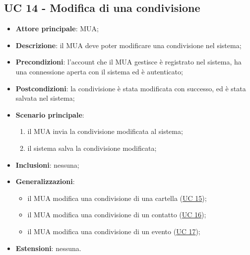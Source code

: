 \subsection{UC 14 - Modifica di una condivisione} \label{sec:UC14}
    \begin{itemize}
        \item \textbf{Attore principale}: MUA;
        \item \textbf{Descrizione}: il MUA deve poter modificare una condivisione nel sistema;
        \item \textbf{Precondizioni}: l’account che il MUA gestisce è registrato nel sistema, ha una connessione aperta con il sistema ed è autenticato;
        \item \textbf{Postcondizioni}: la condivisione è stata modificata con successo, ed è stata salvata nel sistema;
        \item \textbf{Scenario principale}:
            \begin{enumerate}
                \item il MUA invia la condivisione modificata al sistema;
                \item il sistema salva la condivisione modificata;
            \end{enumerate}
        \item \textbf{Inclusioni}: nessuna;
        \item \textbf{Generalizzazioni}:
            \begin{itemize}
                \item il MUA modifica una condivisione di una cartella (\hyperref[sec:UC15]{UC 15});
                \item il MUA modifica una condivisione di un contatto (\hyperref[sec:UC16]{UC 16});
                \item il MUA modifica una condivisione di un evento (\hyperref[sec:UC17]{UC 17});
            \end{itemize}
        \item \textbf{Estensioni}: nessuna.
    \end{itemize}